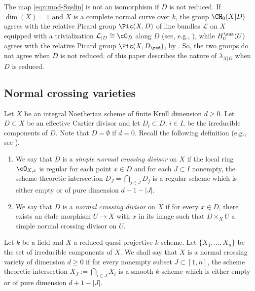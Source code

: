 The map \eqref{eqn:mod-Suslin} is not an isomorphism if $D$ is not reduced. If $\dim(X)=1$ and $X$ is a complete normal curve over $k$, the group $\CH_0(X|D)$ agrees with the relative Picard group $\Pic(X,D)$ of line bundles $\mathcal{L}$ on $X$ equipped with a trivialization $\mathcal{L}_{|D} \cong \cO_D$ along $D$ (see, e.g., \cite[\S 4]{BS}), while $H_0^{\sus}(U)$ agrees with the relative Picard group $\Pic(X, D_{\red})$, by \cite[Th.\,7.16]{MVW}. So, the two groups do not agree when $D$ is not reduced.
 of this paper describes the nature of
$\lambda_{X|D}$ when $D$ is reduced.

\subsection{Normal crossing varieties} Let $X$ be an integral
Noetherian scheme of finite Krull dimension $d\!\ge\!0$.
Let $D\!\subset\!X$ be an effective Cartier divisor and
let $D_i\!\subset\!D$, $i\!\in\!I$, be the irreducible components of $D$.
Note that $D = \emptyset$ if $d = 0$. Recall the following definition
(e.g., see \cite[2.4]{deJong}).

\skpt
\begin{defn}\label{defn:ncs}
\begin{enumerate}
\item
We say that $D$ is a \emph{simple normal crossing divisor} on $X$
if the local ring $\cO_{X,x}$ is regular for each point $x\in D$ and for
each $J \subset I$ nonempty, the scheme theoretic intersection
$D_J = \bigcap_{j\in J} D_j$ is a regular scheme which is either empty or
of pure dimension $d+1-|J|$.

\item
We say that $D$ is a \emph{normal crossing divisor} on $X$ if for every
$x \in D$, there exists an étale morphism $U \to X$ with $x$ in its image
such that $D \times_X U$ a simple normal crossing divisor on $U$.
\end{enumerate}
\end{defn}

\begin{defn}\label{defn:ncg}
Let $k$ be a field and $X$ a reduced quasi-projective $k$-scheme.
Let $\{X_1, \ldots , X_n\}$ be the set of irreducible components of $X$. We
shall say that $X$ is a normal crossing variety of dimension $d \ge 0$
if for every nonempty subset $J \subset [1, n]$, the scheme theoretic
intersection $X_J := \bigcap_{i \in J} X_i$ is a smooth $k$-scheme
which is either empty or of pure dimension $d + 1 - |J|$.
\end{defn}

